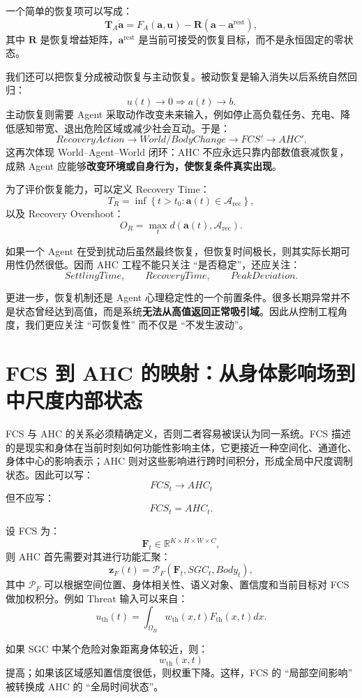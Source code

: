 一个简单的恢复项可以写成：
\[
\mathbf T_A
\dot{\mathbf a}
=
F_A(\mathbf a,\mathbf u)
-
\mathbf R
(\mathbf a-\mathbf a^{\mathrm{rest}}),
\]
其中 $\mathbf R$ 是恢复增益矩阵，$\mathbf a^{\mathrm{rest}}$ 是当前可接受的恢复目标，而不是永恒固定的零状态。

我们还可以把恢复分成被动恢复与主动恢复。被动恢复是输入消失以后系统自然回归：
\[
u(t)\rightarrow0
\Rightarrow
a(t)\rightarrow b.
\]
主动恢复则需要 Agent 采取动作改变未来输入，例如停止高负载任务、充电、降低感知带宽、退出危险区域或减少社会互动。于是：
\[
RecoveryAction
\rightarrow
World/BodyChange
\rightarrow
FCS'
\rightarrow
AHC'.
\]
这再次体现 World--Agent--World 闭环：AHC 不应永远只靠内部数值衰减恢复，成熟 Agent 应能够\textbf{改变环境或自身行为，使恢复条件真实出现}。

为了评价恢复能力，可以定义 Recovery Time：
\[
T_R
=
\inf
\left\{
t>t_0:
\mathbf a(t)\in
\mathcal A_{\mathrm{rec}}
\right\},
\]
以及 Recovery Overshoot：
\[
O_R
=
\max_t
d(
\mathbf a(t),
\mathcal A_{\mathrm{rec}}
).
\]

如果一个 Agent 在受到扰动后虽然最终恢复，但恢复时间极长，则其实际长期可用性仍然很低。因而 AHC 工程不能只关注 ``是否稳定''，还应关注：
\[
SettlingTime,\qquad
RecoveryTime,\qquad
PeakDeviation.
\]

更进一步，恢复机制还是 Agent 心理稳定性的一个前置条件。很多长期异常并不是状态曾经达到高值，而是系统\textbf{无法从高值返回正常吸引域}。因此从控制工程角度，我们更应关注 ``可恢复性'' 而不仅是 ``不发生波动''。


\section{FCS 到 AHC 的映射：从身体影响场到中尺度内部状态}

FCS 与 AHC 的关系必须精确定义，否则二者容易被误认为同一系统。FCS 描述的是现实和身体在当前时刻如何功能性影响主体，它更接近一种空间化、通道化、身体中心的影响表示；AHC 则对这些影响进行跨时间积分，形成全局中尺度调制状态。因此可以写：
\[
\boxed{
FCS_t
\rightarrow
AHC_t
}
\]
但不应写：
\[
FCS_t
=
AHC_t.
\]

设 FCS 为：
\[
\mathbf F_t
\in
\mathbb R^{K\times H\times W\times C},
\]
则 AHC 首先需要对其进行功能汇聚：
\[
\mathbf z_F(t)
=
\mathcal P_F(
\mathbf F_t,
SGC_t,
Body_t
),
\]
其中 $\mathcal P_F$ 可以根据空间位置、身体相关性、语义对象、置信度和当前目标对 FCS 做加权积分。例如 Threat 输入可以来自：
\[
u_{\mathrm{th}}(t)
=
\int_{\Omega_B}
w_{\mathrm{th}}(x,t)
F_{\mathrm{th}}(x,t)
dx.
\]

如果 SGC 中某个危险对象距离身体较近，则：
\[
w_{\mathrm{th}}(x,t)
\]
提高；如果该区域感知置信度很低，则权重下降。这样，FCS 的 ``局部空间影响'' 被转换成 AHC 的 ``全局时间状态''。

